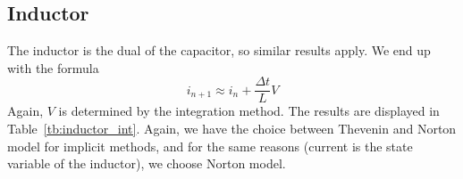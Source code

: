 \documentclass{article}
\begin{document}
\begin{table}[htb!]
\centering
{}
\caption{Capacitor companion model parameters for integration methods \label{tb:cap_int}}
\end{table}

\pagebreak

\subsection{Inductor}
The inductor is the dual of the capacitor, so similar results apply. We end up with the formula
\begin{equation}
i_{n+1} \approx i_n + \frac{\Delta t}{L}V
\end{equation}
Again, $V$ is determined by the integration method. The results are displayed in Table~\ref{tb:inductor_int}. Again, we have the choice between Thevenin and Norton model for implicit methods, and for the same reasons (current is the state variable of the inductor), we choose Norton model.
\end{document}
